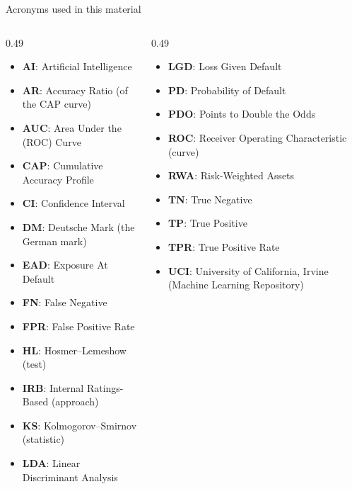 {
\begin{frame}[noframenumbering]
    \titlepage
\end{frame}
}
\begin{frame}{Acronyms used in this material}
\begin{columns}[T]
\begin{column}{0.49\textwidth}
\begin{itemize}\setlength{\itemsep}{0pt}
    \item \textbf{AI}: Artificial Intelligence
    \item \textbf{AR}: Accuracy Ratio (of the CAP curve)
    \item \textbf{AUC}: Area Under the (ROC) Curve
    \item \textbf{CAP}: Cumulative Accuracy Profile
    \item \textbf{CI}: Confidence Interval
    \item \textbf{DM}: Deutsche Mark (the German mark)
    \item \textbf{EAD}: Exposure At Default
    \item \textbf{FN}: False Negative
    \item \textbf{FPR}: False Positive Rate
    \item \textbf{HL}: Hosmer–Lemeshow (test)
    \item \textbf{IRB}: Internal Ratings-Based (approach)
    \item \textbf{KS}: Kolmogorov–Smirnov (statistic)
    \item \textbf{LDA}: Linear Discriminant Analysis
\end{itemize}
\end{column}
\begin{column}{0.49\textwidth}
\begin{itemize}\setlength{\itemsep}{0pt}
    \item \textbf{LGD}: Loss Given Default
    \item \textbf{PD}: Probability of Default
    \item \textbf{PDO}: Points to Double the Odds
    \item \textbf{ROC}: Receiver Operating Characteristic (curve)
    \item \textbf{RWA}: Risk-Weighted Assets
    \item \textbf{TN}: True Negative
    \item \textbf{TP}: True Positive
    \item \textbf{TPR}: True Positive Rate
    \item \textbf{UCI}: University of California, Irvine (Machine Learning Repository)
\end{itemize}
\end{column}
\end{columns}
\end{frame}

